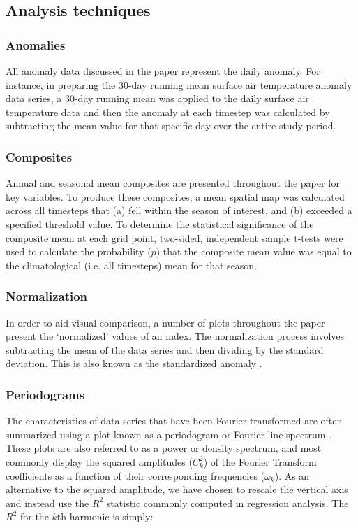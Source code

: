 \subsection{Analysis techniques}

\subsubsection{Anomalies}
All anomaly data discussed in the paper represent the daily anomaly. For instance, in preparing the 30-day running mean surface air temperature anomaly data series, a 30-day running mean was applied to the daily surface air temperature data and then the anomaly at each timestep was calculated by subtracting the mean value for that specific day over the entire study period.

\subsubsection{Composites}
Annual and seasonal mean composites are presented throughout the paper for key variables. To produce these composites, a mean spatial map was calculated across all timesteps that (a) fell within the season of interest, and (b) exceeded a specified threshold value. To determine the statistical significance of the composite mean at each grid point, two-sided, independent sample t-tests were used to calculate the probability ($p$) that the composite mean value was equal to the climatological (i.e. all timesteps) mean for that season.

\subsubsection{Normalization}
In order to aid visual comparison, a number of plots throughout the paper present the `normalized' values of an index. The normalization process involves subtracting the mean of the data series and then dividing by the standard deviation. This is also known as the standardized anomaly \citep{Wilks2011}. 

\subsubsection{Periodograms} %
The characteristics of data series that have been Fourier-transformed are often summarized using a plot known as a periodogram or Fourier line spectrum \citep{Wilks2011}. These plots are also referred to as a power or density spectrum, and most commonly display the squared amplitudes ($C_k^2$) of the Fourier Transform coefficients as a function of their corresponding frequencies ($\omega_k$). As an alternative to the squared amplitude, we have chosen to rescale the vertical axis and instead use the $R^2$ statistic commonly computed in regression analysis. The $R^2$ for the $k$th harmonic is simply:

